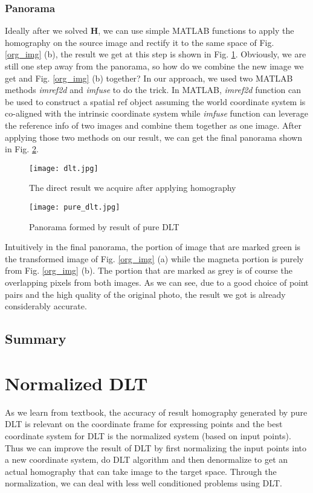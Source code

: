 \documentclass[conference]{IEEEtran}
\newcommand{\mat}[1]{\mathbf{#1}} %
\begin{document}
\subsubsection{Panorama}
Ideally after we solved $\mat{H}$, we can use simple MATLAB functions to apply the homography on the source image and rectify it to the same space of Fig. \ref{org_img} (b), the result we get at this step is shown in Fig. \ref{dlt1}. Obviously, we are still one step away from the panorama, so how do we combine the new image we get and Fig. \ref{org_img} (b) together? In our approach, we used two MATLAB methods \emph{imref2d} and \emph{imfuse} to do the trick. In MATLAB, \emph{imref2d} function can be used to construct a spatial ref object assuming the world coordinate system is co-aligned with the intrinsic coordinate system while \emph{imfuse} function can leverage the reference info of two images and combine them together as one image. After applying those two methods on our result, we can get the final panorama shown in Fig. \ref{pure_dlt}.

\begin{figure}[htbp]
\begin{center}
\texttt{[image: dlt.jpg]} 
\end{center}	   
\caption{The direct result we acquire after applying homography}\label{dlt1}
\end{figure}

\begin{figure}[htbp]
\begin{center}
\texttt{[image: pure\_dlt.jpg]} 
\end{center}	   
\caption{Panorama formed by result of pure DLT}\label{pure_dlt}
\end{figure}

Intuitively in the final panorama, the portion of image that are marked green is the transformed image of Fig. \ref{org_img} (a) while the magneta portion is purely from Fig. \ref{org_img} (b). The portion that are marked as grey is of course the overlapping pixels from both images. As we can see, due to a good choice of point pairs and the high quality of the original photo, the result we got is already considerably accurate.

\subsection{Summary}

\section{Normalized DLT}
As we learn from textbook, the accuracy of result homography generated by pure DLT is relevant on the coordinate frame for expressing points and the best coordinate system for DLT is the normalized system (based on input points). Thus we can improve the result of DLT by first normalizing the input points into a new coordinate system, do DLT algorithm and then denormalize to get an actual homography that can take image to the target space. Through the normalization, we can deal with less well conditioned problems using DLT.
\end{document}

